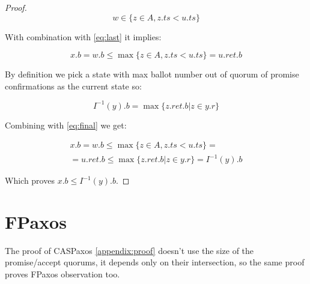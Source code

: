 \documentclass[12pt]{article}
\theoremstyle{definition}
\begin{document}
\begin{appendices}
\begin{proof}
  \begin{equation}
    w \in \{ z \in A, z.ts < u.ts \}
  \end{equation}

  With combination with \ref{eq:last} it implies:

  \begin{equation} \label{eq:final}
    x.b = w.b \leq \max \{ z \in A, z.ts < u.ts \} = u.ret.b
  \end{equation}

  By definition we pick a state with max ballot number out of quorum of promise confirmations as the current state so:

  \begin{equation}
    I^{-1}(y).b = \max \{ z.ret.b | z \in y.r \}
  \end{equation}

  Combining with \ref{eq:final} we get:

  \begin{multline}
    x.b = w.b \leq \max \{ z \in A, z.ts < u.ts \} = \\
    = u.ret.b \leq \max \{ z.ret.b | z \in y.r \} = I^{-1}(y).b
  \end{multline}

  Which proves $x.b \leq I^{-1}(y).b$.

\end{proof}

\section{FPaxos}
\label{appendix:fpaxos}
The proof of CASPaxos \ref{appendix:proof} doesn't use the size of the promise/accept quorums, it depends only on their intersection, so the same proof proves FPaxos observation too.

\end{appendices}

\newpage
\end{document}
